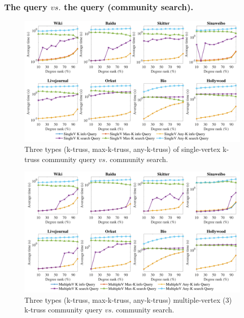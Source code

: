 \subsubsection{The \toplevelprob{} query $vs.$ the \bottomlevelprob{} query (community search).}
\label{eval_top_bottom_compare}

\begin{figure}[ht]
    \centering
    \includegraphics[width=\linewidth]{./figures/singlev_info_query.pdf}
    \caption{Three types (k-truss, max-k-truss, any-k-truss) of single-vertex \toplevelprob{} k-truss community query $vs.$ community search.}
    \label{fig:singlev_info_query}
\end{figure}


\begin{figure}[ht]
    \centering
    \includegraphics[width=\linewidth]{./figures/multiplev_3_info_query.pdf}
    \caption{Three types (k-truss, max-k-truss, any-k-truss) multiple-vertex ($3$) \toplevelprob{} k-truss community query $vs.$ community search.}
    \label{fig:multiplev_3_info_query}
\end{figure}


